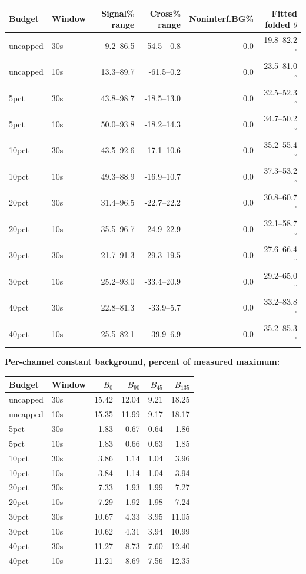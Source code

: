\documentclass[10pt,a4paper]{article}
\begin{document}
\begin{longtable}{llrrrr}\toprule
Budget & Window & Signal\% range & Cross\% range & Noninterf.BG\% & Fitted folded $\theta$\\\midrule\endhead
uncapped & 30s & 9.2--86.5 & -54.5---0.8 & 0.0 & 19.8--82.2$^\circ$ \\
uncapped & 10s & 13.3--89.7 & -61.5--0.2 & 0.0 & 23.5--81.0$^\circ$ \\
5pct & 30s & 43.8--98.7 & -18.5--13.0 & 0.0 & 32.5--52.3$^\circ$ \\
5pct & 10s & 50.0--93.8 & -18.2--14.3 & 0.0 & 34.7--50.2$^\circ$ \\
10pct & 30s & 43.5--92.6 & -17.1--10.6 & 0.0 & 35.2--55.4$^\circ$ \\
10pct & 10s & 49.3--88.9 & -16.9--10.7 & 0.0 & 37.3--53.2$^\circ$ \\
20pct & 30s & 31.4--96.5 & -22.7--22.2 & 0.0 & 30.8--60.7$^\circ$ \\
20pct & 10s & 35.5--96.7 & -24.9--22.9 & 0.0 & 32.1--58.7$^\circ$ \\
30pct & 30s & 21.7--91.3 & -29.3--19.5 & 0.0 & 27.6--66.4$^\circ$ \\
30pct & 10s & 25.2--93.0 & -33.4--20.9 & 0.0 & 29.2--65.0$^\circ$ \\
40pct & 30s & 22.8--81.3 & -33.9--5.7 & 0.0 & 33.2--83.8$^\circ$ \\
40pct & 10s & 25.5--82.1 & -39.9--6.9 & 0.0 & 35.2--85.3$^\circ$ \\
\bottomrule\end{longtable}
\textbf{Per-channel constant background, percent of measured maximum:}
\begin{longtable}{llrrrr}\toprule
Budget & Window & $B_0$ & $B_{90}$ & $B_{45}$ & $B_{135}$\\\midrule\endhead
uncapped & 30s & 15.42 & 12.04 & 9.21 & 18.25\\
uncapped & 10s & 15.35 & 11.99 & 9.17 & 18.17\\
5pct & 30s & 1.83 & 0.67 & 0.64 & 1.86\\
5pct & 10s & 1.83 & 0.66 & 0.63 & 1.85\\
10pct & 30s & 3.86 & 1.14 & 1.04 & 3.96\\
10pct & 10s & 3.84 & 1.14 & 1.04 & 3.94\\
20pct & 30s & 7.33 & 1.93 & 1.99 & 7.27\\
20pct & 10s & 7.29 & 1.92 & 1.98 & 7.24\\
30pct & 30s & 10.67 & 4.33 & 3.95 & 11.05\\
30pct & 10s & 10.62 & 4.31 & 3.94 & 10.99\\
40pct & 30s & 11.27 & 8.73 & 7.60 & 12.40\\
40pct & 10s & 11.21 & 8.69 & 7.56 & 12.35\\
\bottomrule\end{longtable}
\end{document}
